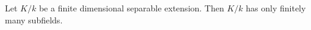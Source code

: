 Let $K/k$ be a finite dimensional separable extension. Then $K/k$ has only finitely many subfields.
